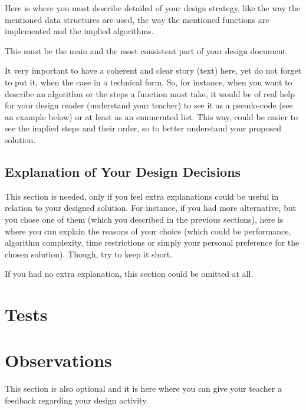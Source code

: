 Here is where you must describe detailed of your design strategy, like the way the mentioned data structures are used, the way the mentioned functions are implemented and the implied algorithms. 

This must be the main and the most consistent part of your design document.

It very important to have a coherent and clear story (text) here, yet do not forget to put it, when the case in a technical form. So, for instance, when you want to describe an algorithm or the steps a function must take, it would be of real help for your design reader (understand your teacher) to see it as a pseudo-code (see an example below) or at least as an enumerated list. This way, could be easier to see the implied steps and their order, so to better understand your proposed solution.


\subsection{Explanation of Your Design Decisions}

This section is needed, only if you feel extra explanations could be useful in relation to your designed solution. For instance, if you had more alternative, but you chose one of them (which you described in the previous sections), here is where you can explain the reasons of your choice (which could be performance, algorithm complexity, time restrictions or simply your personal preference for the chosen solution). Though, try to keep it short. 

If you had no extra explanation, this section could be omitted at all. 


\section{Tests}



\section{Observations}

This section is also optional and it is here where you can give your teacher a feedback regarding your design activity.

